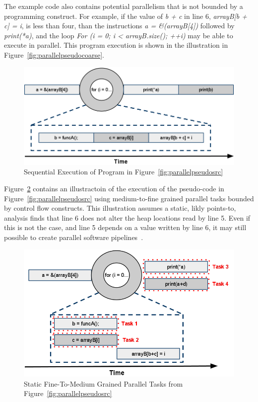 \documentclass[defaultstyle,11pt]{thesis}
\begin{document}
The example code also contains potential parallelism that is not
bounded by a programming construct.  For example, if the value of
\textit{b + c} in line 6, \textit{arrayB[b + c] = i}, is less than
four, than the instructions \textit{ a = \&(arrayB[4])} followed by
\textit{print(*a)}, and the loop \textit{For (i = 0; i <
  arrayB.size(); ++i)} may be able to execute in parallel.  This
program execution is shown in the illustration in
Figure~\ref{fig:parallelpseudocoarse}.

\begin{figure}
\begin{center}
\includegraphics[width=6in]{images/ParallelTasksSequential}
\end{center}
\caption{Sequential Execution of Program in Figure~\ref{fig:parallelpseudosrc}}
\label{fig:parallelpseudoseq}
\end{figure}

Figure~\ref{fig:parallelpseudomedcntl} contains an illustractoin of
the execution of the pseudo-code in Figure~\ref{fig:parallelpseudosrc}
using medium-to-fine grained parallel tasks bounded by control flow
constructs.  This illustration assumes a static, likly points-to,
analysis finds that line 6 does not alter the heap locations read by
line 5.  Even if this is not the case, and line 5 depends on a value
written by line 6, it may still possible to create parallel software
pipelines~\cite{rangan:04:pact, giacomoni:08:ppopp}.

\begin{figure}
\begin{center}
\includegraphics[width=5in]{images/ParallelTasksMedControl}
\end{center}
\caption{Static Fine-To-Medium Grained Parallel Tasks from Figure~\ref{fig:parallelpseudosrc}}
\label{fig:parallelpseudomedcntl}
\end{figure}
\end{document}

